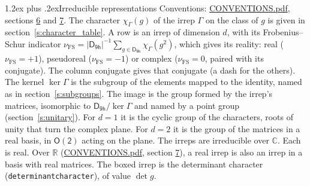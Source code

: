 \documentclass[10pt,a4paper]{article}
\makeatletter
\renewcommand\section{\@startsection{section}{1}{\z@}{-3ex plus -1ex minus -.2ex}%
  {1.2ex plus .2ex}{\normalfont\large\sffamily\bfseries\color{parttitle}}}
\numberwithin{equation}{section}
\newcommand{\grp}[1]{\mathsf{#1}}
\newcommand{\irchar}[1]{\chi_{#1}}
\newcommand{\fsind}{\nu_{\mathrm{FS}}}
\makeatother
\begin{document}
\section{Irreducible representations}\label{s:irreps}
Conventions: \href{../../CONVENTIONS.pdf}{CONVENTIONS.pdf}, sections \href{../../CONVENTIONS.pdf\#conv.6}{6} and \href{../../CONVENTIONS.pdf\#conv.7}{7}.
\leavevmode\label{n:function.character}\label{n:irrep.Gamma}The character $\irchar{\Gamma}(g)$ of the irrep $\Gamma$ on the class of $g$ is given in section~\ref{s:character_table}.
\leavevmode\label{n:index.dimension}\label{n:index.frobenius}\label{n:head.irrep}\label{n:head.reality}A row is an irrep of dimension $d$, with its Frobenius--Schur indicator $\fsind = |\grp{D_{9h}}|^{-1}\allowbreak\sum_{g\in\grp{D_{9h}}}\irchar{\Gamma}(g^2)$, which gives its reality: real ($\fsind = +1$), pseudoreal ($\fsind = -1$) or complex ($\fsind = 0$, paired with its conjugate). \label{n:head.conjugate}The column conjugate gives that conjugate (a dash for the others). \label{n:head.kernel}The kernel $\ker\Gamma$ is the subgroup of the elements mapped to the identity, named as in section~\ref{s:subgroups}. \label{n:head.image}The image is the group formed by the irrep's matrices, isomorphic to $\grp{D_{9h}}/\ker\Gamma$ and named by a point group (section~\ref{s:unitary}). For $d = 1$ it is the cyclic group of the characters, roots of unity that turn the complex plane. For $d = 2$ it is the group of the matrices in a real basis, in $\grp{O(2)}$ acting on the plane. The irreps are irreducible over $\mathbb{C}$. Each is real. Over $\mathbb{R}$ (\href{../../CONVENTIONS.pdf}{CONVENTIONS.pdf}, section \href{../../CONVENTIONS.pdf\#conv.7}{7}), a real irrep is also an irrep in a basis with real matrices. \label{n:mark.determinant}The boxed irrep is the determinant character (\texttt{determinantcharacter}), of value $\det g$.
\setlength{\emergencystretch}{2em}\par\setlength{\emergencystretch}{0pt}
\end{document}
